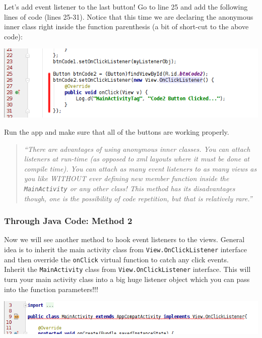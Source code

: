 Let's add event listener to the last button! Go to line 25 and add the following lines of code (lines 25-31). Notice that this time we are declaring the anonymous inner class right inside the function parenthesis (a bit of short-cut to the above code):

\begin{center}
	\includegraphics[scale=0.4]{chapters/ch05/images/8}
\end{center}

Run the app and make sure that all of the buttons are working properly.

\begin{quote}
	\textit{``There are advantages of using anonymous inner classes. You can attach listeners at run-time (as opposed to xml layouts where it must be done at compile time). You can attach as many event listeners to as many views as you like WITHOUT ever defining new member function inside the \texttt{MainActivity} or any other class! This method has its disadvantages though, one is the possibility of code repetition, but that is relatively rare.''}
\end{quote}

\subsubsection{Through Java Code: Method 2}
Now we will see another method to hook event listeners to the views. General idea is to inherit the main activity class from \texttt{View.OnClickListener} interface and then override the \texttt{onClick} virtual function to catch any click events. \\

Inherit the \texttt{MainActivity} class from \texttt{View.OnClickListener} interface. This will turn your main activity class into a big huge listener object which you can pass into the function parameters!!!

\begin{center}
	\includegraphics[scale=0.4]{chapters/ch05/images/9}
\end{center}

